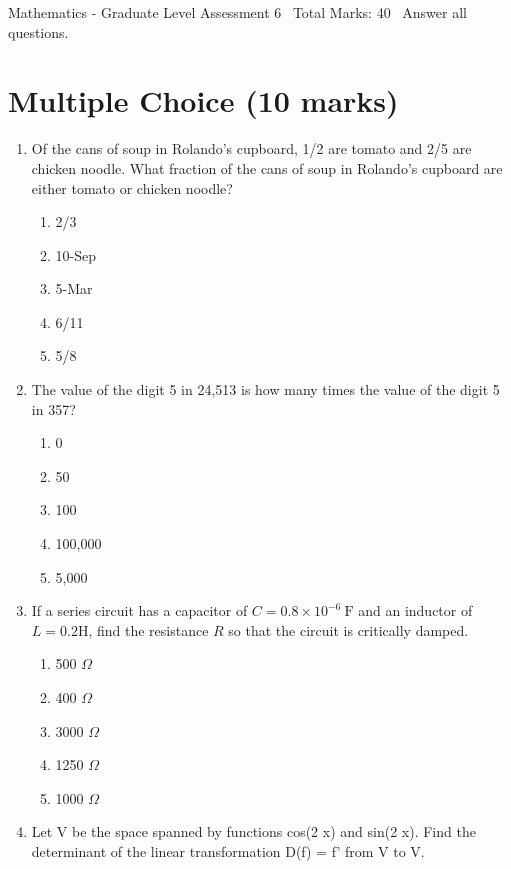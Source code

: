 \documentclass[12pt]{article}
\begin{document}
\begin{center}
Mathematics - Graduate Level Assessment 6 \
Total Marks: 40 \
Answer all questions.
\end{center}

\section*{Multiple Choice (10 marks)}
\begin{enumerate}[label=\arabic*.]
\item Of the cans of soup in Rolando's cupboard, 1/2 are tomato and 2/5 are chicken noodle. What fraction of the cans of soup in Rolando's cupboard are either tomato or chicken noodle?
\begin{enumerate}[label=(\alph*)]
    \item 2/3
    \item 10-Sep
    \item 5-Mar
    \item 6/11
    \item 5/8
\end{enumerate}
\item The value of the digit 5 in 24,513 is how many times the value of the digit 5 in 357?
\begin{enumerate}[label=(\alph*)]
    \item 0
    \item 50
    \item 100
    \item 100,000
    \item 5,000
\end{enumerate}
\item If a series circuit has a capacitor of $C=0.8 \times 10^{-6} \mathrm{~F}$ and an inductor of $L=0.2 \mathrm{H}$, find the resistance $R$ so that the circuit is critically damped.
\begin{enumerate}[label=(\alph*)]
    \item 500 $\Omega$
    \item 400 $\Omega$
    \item 3000 $\Omega$
    \item 1250 $\Omega$
    \item 1000 $\Omega$
\end{enumerate}
\item Let V be the space spanned by functions cos(2 x) and sin(2 x). Find the determinant of the linear transformation D(f) = f' from V to V.
\begin{enumerate}[label=(\alph*)]

\end{enumerate}
\end{enumerate}
\end{document}
